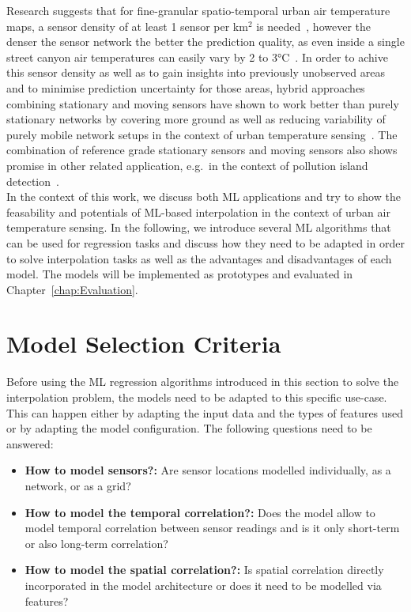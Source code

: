 Research suggests that for fine-granular spatio-temporal urban air temperature maps, a sensor density of at least 1 sensor per km$^{2}$ is needed~\cite{venter2020hyperlocal}, however the denser the sensor network the better the prediction quality, as even inside a single street canyon air temperatures can easily vary by 2 to 3°C~\cite{sugawara2008temperature}.
In order to achive this sensor density as well as to gain insights into previously unobserved areas and to minimise prediction uncertainty for those areas, hybrid approaches combining stationary and moving sensors have shown to work better than purely stationary networks by covering more ground as well as reducing variability of purely mobile network setups in the context of urban temperature sensing~\cite{yang2019designing}. The combination of reference grade stationary sensors and moving sensors also shows promise in other related application, e.g.\ in the context of pollution island detection~\cite{iyer2022modeling}.\\
In the context of this work, we discuss both ML applications and try to show the feasability and potentials of ML-based interpolation in the context of urban air temperature sensing.
In the following, we introduce several ML algorithms that can be used for regression tasks and discuss how they need to be adapted in order to solve interpolation tasks as well as the advantages and disadvantages of each model. The models will be implemented as prototypes and evaluated in Chapter~\ref{chap:Evaluation}.

\section{Model Selection Criteria}
\label{sec: model selection criteria}

Before using the ML regression algorithms introduced in this section to solve the interpolation problem, the models need to be adapted to this specific use-case. This can happen either by adapting the input data and the types of features used or by adapting the model configuration. The following questions need to be answered:

\begin{itemize}
    \item \textbf{How to model sensors?:} Are sensor locations modelled individually, as a network, or as a grid?
    \item \textbf{How to model the temporal correlation?:} Does the model allow to model temporal correlation between sensor readings and is it only short-term or also long-term correlation?
    \item \textbf{How to model the spatial correlation?:} Is spatial correlation directly incorporated in the model architecture or does it need to be modelled via features?
\end{itemize}

